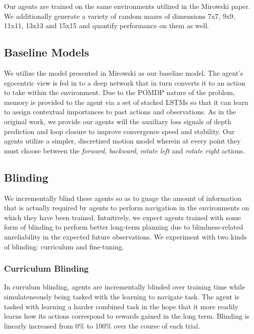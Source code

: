 
Our agents are trained on the same environments utilized in the Mirowski \etal paper. We additionally generate a variety of random mazes of dimensions 7x7, 9x9, 11x11, 13x13 and 15x15 and quantify performance on them as well.

\subsection{Baseline Models}
We utilize the model presented in Mirowski \etal as our baseline model. The agent's egocentric view is fed in to a deep network that in turn converts it to an action to take within the environment. Due to the POMDP nature of the problem, memory is provided to the agent via a set of stacked LSTMs so that it can learn to assign contextual importances to past actions and observations. As in the original work, we provide our agents will the auxiliary loss signals of depth prediction and loop closure to improve convergence speed and stability. Our agents utilize a simpler, discretized motion model wherein at every point they must choose between the \emph{forward}, \emph{backward}, \emph{rotate left} and \emph{rotate right} actions.

\subsection{Blinding}
We incrementally blind these agents so as to guage the amount of information that is actually required by agents to perform navigation in the environments on which they have been trained. Intuitively, we expect agents trained with some form of blinding to perform better long-term planning due to blindness-related unreliability in the expected future observations. We experiment with two kinds of blinding: curriculum and fine-tuning. 

\subsubsection{Curriculum Blinding}
In currulum blinding, agents are incrementally blinded over training time while simulateneously being tasked with the learning to navigate task. The agent is tasked with learning a harder combined task in the hope that it more readily learns how its actions correspond to rewards gained in the long term. Blinding is linearly increased from 0\% to 100\% over the course of each trial. 

